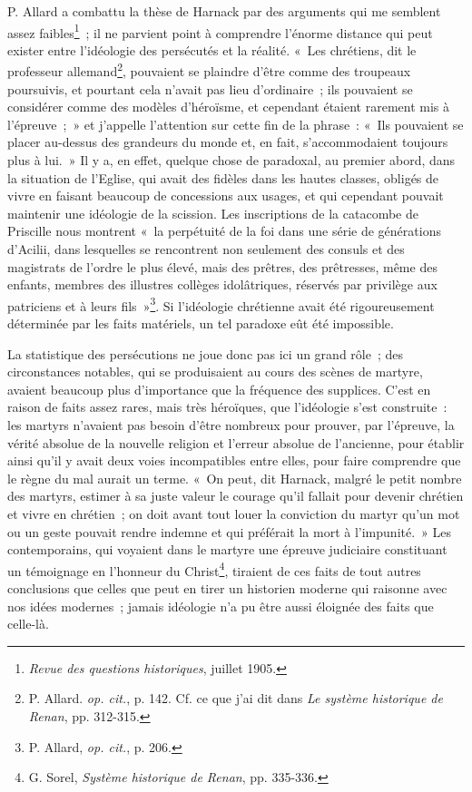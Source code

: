 \documentclass[french,twoside]{book} %
\begin{document}
 P. Allard a combattu la thèse de Harnack par des arguments qui me semblent assez faibles\footnote{ \noindent \emph{Revue des questions historiques}, juillet 1905.
 } ; il ne parvient point à comprendre l’énorme distance qui peut exister entre l’idéologie des persécutés et la réalité. « Les chrétiens, dit le professeur allemand\footnote{ \noindent P. Allard. \emph{op. cit.}, p. 142. Cf. ce que j’ai dit dans \emph{Le système historique de Renan}, pp. 312-315.
 }, pouvaient se plaindre d’être comme des troupeaux poursuivis, et pourtant cela n’avait pas lieu d’ordinaire ; ils pouvaient se considérer comme des modèles d’héroïsme, et cependant étaient rarement mis à l’épreuve ; » et j’appelle l’attention sur cette fin de la phrase : « Ils pouvaient se placer au-dessus des grandeurs du monde et, en fait, s’accommodaient toujours plus à lui. » Il y a, en effet, quelque chose de paradoxal, au premier abord, dans la situation de l’Eglise, qui avait des fidèles dans les hautes classes, obligés de vivre en faisant beaucoup de concessions aux usages, et qui cependant pouvait maintenir une idéologie de la scission. Les inscriptions de la catacombe de Priscille nous montrent « la perpétuité de la foi dans une série de générations d’Acilii, dans lesquelles se rencontrent non seulement des consuls et des magistrats de l’ordre le plus élevé, mais des prêtres, des prêtresses, même des enfants, membres des illustres collèges idolâtriques, réservés par privilège aux patriciens et à leurs fils »\footnote{ \noindent P. Allard, \emph{op. cit.}, p. 206.
 }. Si l’idéologie chrétienne avait été rigoureusement déterminée par les faits matériels, un tel paradoxe eût été impossible.\par
 La statistique des persécutions ne joue donc pas ici un grand rôle ; des circonstances notables, qui se produisaient au cours des scènes de martyre, avaient beaucoup plus d’importance que la fréquence des supplices. C’est en raison de faits assez rares, mais très héroïques, que l’idéologie s’est construite : les martyrs n’avaient pas besoin d’être nombreux pour prouver, par l’épreuve, la vérité absolue de la nouvelle religion et l’erreur absolue de l’ancienne, pour établir ainsi qu’il y avait deux voies incompatibles entre elles, pour faire comprendre que le règne du mal aurait un terme. « On peut, dit Harnack, malgré le petit nombre des martyrs, estimer à sa juste valeur le courage qu’il fallait pour devenir chrétien et vivre en chrétien ; on doit avant tout louer la conviction du martyr qu’un mot ou un geste pouvait rendre indemne et qui préférait la mort à l’impunité. » Les contemporains, qui voyaient dans le martyre une épreuve judiciaire constituant un témoignage en l’honneur du Christ\footnote{ \noindent G. Sorel, \emph{Système historique de Renan}, pp. 335-336.
 }, tiraient de ces faits de tout autres conclusions que celles que peut en tirer un historien moderne qui raisonne avec nos idées modernes ; jamais idéologie n’a pu être aussi éloignée des faits que celle-là.\par
\end{document}
